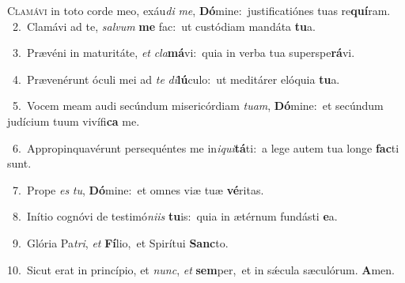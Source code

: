 \lettrine{\initial\textcolor{\initialcolor}{C}}{lamávi} in toto corde meo, exáu\textit{di} \textit{me}\-, \textbf{Dó}\-mine:~\star justificatiónes tuas re\-\textbf{quí}\-ram.\\
{\numbfont\textcolor{\numbcolor}{~2.}}~Clamávi ad te, \textit{sal}\-\textit{vum} \textbf{me} fac:~\star ut custódiam mandáta \textbf{tu}\-a.\par
{\numbfont\textcolor{\numbcolor}{~3.}}~Prævéni in maturitáte, \textit{et} \textit{cla}\-\textbf{má}vi:~\star quia in verba tua superspe\-\textbf{rá}\-vi.\par
{\numbfont\textcolor{\numbcolor}{~4.}}~Prævenérunt óculi mei ad \textit{te} \textit{di}\-\textbf{lú}culo:~\star ut meditárer elóquia \textbf{tu}\-a.\par
{\numbfont\textcolor{\numbcolor}{~5.}}~Vocem meam audi secúndum misericórdiam \textit{tu}\-\textit{am}, \textbf{Dó}\-mine:~\star et secúndum judícium tuum vivífi\textbf{ca} me.\par
{\numbfont\textcolor{\numbcolor}{~6.}}~Appropinquavérunt persequéntes me in\-\textit{i}\-\textit{qui}\textbf{tá}ti:~\star a lege autem tua longe \textbf{fac}\-ti sunt.\par
{\numbfont\textcolor{\numbcolor}{~7.}}~Prope \textit{es} \textit{tu}\-, \textbf{Dó}\-mine:~\star et omnes viæ tuæ \textbf{vé}\-ritas.\par
{\numbfont\textcolor{\numbcolor}{~8.}}~Inítio cognóvi de testimó\-\textit{ni}\-\textit{is} \textbf{tu}\-is:~\star quia in ætérnum fundásti \textbf{e}\-a.\par
{\numbfont\textcolor{\numbcolor}{~9.}}~Glória Pa\-\textit{tri}\-, \textit{et} \textbf{Fí}\-lio,~\star et Spirítui \textbf{Sanc}\-to.\par
{\numbfont\textcolor{\numbcolor}{10.}}~Sicut erat in princípio, et \textit{nunc}\-, \textit{et} \textbf{sem}\-per,~\star et in sǽcula sæculórum. \textbf{A}\-men.\par
